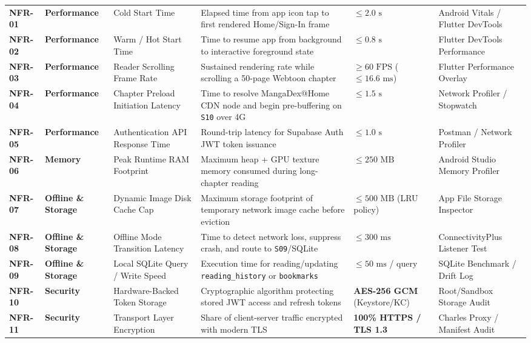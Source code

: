 \begin{scriptsize}
\begin{longtable}{C{1.2cm} L{2.0cm} L{2.8cm} L{3.5cm} C{2.1cm} L{2.25cm}}
\textbf{NFR-01} & \textbf{Performance} & Cold Start Time & Elapsed time from app icon tap to first rendered Home/Sign-In frame & $\le 2.0\text{ s}$ & Android Vitals / Flutter DevTools \\
\textbf{NFR-02} & \textbf{Performance} & Warm / Hot Start Time & Time to resume app from background to interactive foreground state & $\le 0.8\text{ s}$ & Flutter DevTools Performance \\
\textbf{NFR-03} & \textbf{Performance} & Reader Scrolling Frame Rate & Sustained rendering rate while scrolling a 50-page Webtoon chapter & $\ge 60\text{ FPS}$ ($\le 16.6\text{ ms}$) & Flutter Performance Overlay \\
\textbf{NFR-04} & \textbf{Performance} & Chapter Preload Initiation Latency & Time to resolve MangaDex@Home CDN node and begin pre-buffering on \texttt{S10} over 4G & $\le 1.5\text{ s}$ & Network Profiler / Stopwatch \\
\textbf{NFR-05} & \textbf{Performance} & Authentication API Response Time & Round-trip latency for Supabase Auth JWT token issuance & $\le 1.0\text{ s}$ & Postman / Network Profiler \\
\textbf{NFR-06} & \textbf{Memory} & Peak Runtime RAM Footprint & Maximum heap + GPU texture memory consumed during long-chapter reading & $\le 250\text{ MB}$ & Android Studio Memory Profiler \\
\textbf{NFR-07} & \textbf{Offline \& Storage} & Dynamic Image Disk Cache Cap & Maximum storage footprint of temporary network image cache before eviction & $\le 500\text{ MB}$ (LRU policy) & App File Storage Inspector \\
\textbf{NFR-08} & \textbf{Offline \& Storage} & Offline Mode Transition Latency & Time to detect network loss, suppress crash, and route to \texttt{S09}/SQLite & $\le 300\text{ ms}$ & ConnectivityPlus Listener Test \\
\textbf{NFR-09} & \textbf{Offline \& Storage} & Local SQLite Query / Write Speed & Execution time for reading/updating \texttt{reading\_history} or \texttt{bookmarks} & $\le 50\text{ ms}$ / query & SQLite Benchmark / Drift Log \\
\textbf{NFR-10} & \textbf{Security} & Hardware-Backed Token Storage & Cryptographic algorithm protecting stored JWT access and refresh tokens & \textbf{AES-256 GCM} (Keystore/KC) & Root/Sandbox Storage Audit \\
\textbf{NFR-11} & \textbf{Security} & Transport Layer Encryption & Share of client-server traffic encrypted with modern TLS & \textbf{100\% HTTPS / TLS 1.3} & Charles Proxy / Manifest Audit \\

\end{longtable}
\end{scriptsize}
